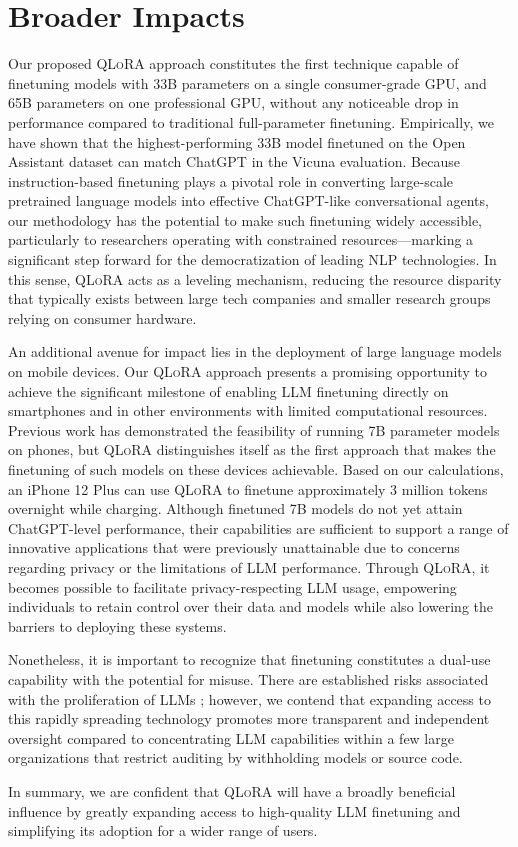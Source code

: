 \section{Broader Impacts}

Our proposed \textsc{QLoRA} approach constitutes the first technique capable of finetuning models with 33B parameters on a single consumer-grade GPU, and 65B parameters on one professional GPU, without any noticeable drop in performance compared to traditional full-parameter finetuning. Empirically, we have shown that the highest-performing 33B model finetuned on the Open Assistant dataset can match ChatGPT in the Vicuna evaluation. Because instruction-based finetuning plays a pivotal role in converting large-scale pretrained language models into effective ChatGPT-like conversational agents, our methodology has the potential to make such finetuning widely accessible, particularly to researchers operating with constrained resources—marking a significant step forward for the democratization of leading NLP technologies. In this sense, \textsc{QLoRA} acts as a leveling mechanism, reducing the resource disparity that typically exists between large tech companies and smaller research groups relying on consumer hardware.

An additional avenue for impact lies in the deployment of large language models on mobile devices. Our \textsc{QLoRA} approach presents a promising opportunity to achieve the significant milestone of enabling LLM finetuning directly on smartphones and in other environments with limited computational resources. Previous work has demonstrated the feasibility of running 7B parameter models on phones, but \textsc{QLoRA} distinguishes itself as the first approach that makes the finetuning of such models on these devices achievable. Based on our calculations, an iPhone 12 Plus can use \textsc{QLoRA} to finetune approximately 3 million tokens overnight while charging. Although finetuned 7B models do not yet attain ChatGPT-level performance, their capabilities are sufficient to support a range of innovative applications that were previously unattainable due to concerns regarding privacy or the limitations of LLM performance. Through \textsc{QLoRA}, it becomes possible to facilitate privacy-respecting LLM usage, empowering individuals to retain control over their data and models while also lowering the barriers to deploying these systems.

Nonetheless, it is important to recognize that finetuning constitutes a dual-use capability with the potential for misuse. There are established risks associated with the proliferation of LLMs \citep{bommasani2021opportunities,bender2021dangers}; however, we contend that expanding access to this rapidly spreading technology promotes more transparent and independent oversight compared to concentrating LLM capabilities within a few large organizations that restrict auditing by withholding models or source code.

In summary, we are confident that \textsc{QLoRA} will have a broadly beneficial influence by greatly expanding access to high-quality LLM finetuning and simplifying its adoption for a wider range of users.